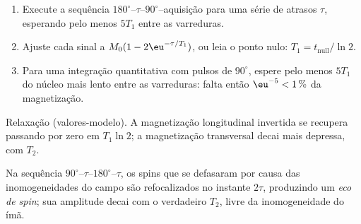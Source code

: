 \begin{method}\label{met:b3:advanced-nmr:t1}
\begin{enumerate}
  \item Execute a sequência $180^\circ$--$\tau$--$90^\circ$--aquisição para uma série de atrasos
        $\tau$, esperando pelo menos $5T_1$ entre as varreduras.
  \item Ajuste cada sinal a $M_0(1 - 2\eu^{-\tau/T_1})$, ou leia o ponto nulo: $T_1 =
        t_{\mathrm{null}}/\ln2$.
  \item Para uma integração quantitativa com pulsos de $90^\circ$, espere pelo menos $5T_1$ do
        núcleo mais lento entre as varreduras: falta então $\eu^{-5} < 1\,\%$ da
        magnetização.
\end{enumerate}
\end{method}

\begin{omfigure}

{\small Relaxação (valores-modelo). A magnetização longitudinal invertida se
recupera passando por zero em $T_1\ln2$; a magnetização transversal decai mais
depressa, com $T_2$.}
\end{omfigure}

\begin{definition}\label{def:b3:advanced-nmr:echo}
Na sequência $90^\circ$--$\tau$--$180^\circ$--$\tau$, os spins que se defasaram por
causa das inomogeneidades do campo são refocalizados no instante $2\tau$, produzindo
um \emph{eco de spin}; sua amplitude decai com o verdadeiro $T_2$,
livre da inomogeneidade do ímã.
\end{definition}

